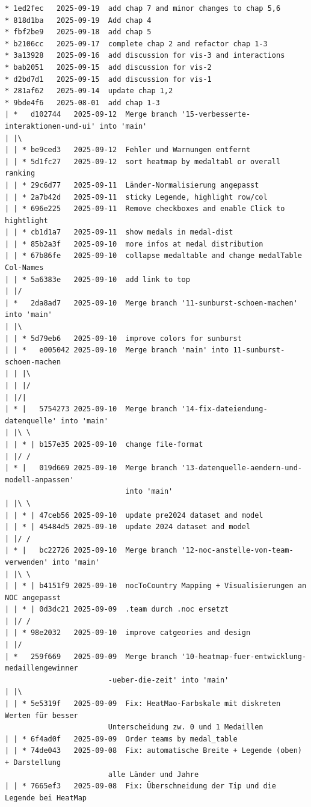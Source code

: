 \documentclass[usegeometry=true]{scrartcl}
\begin{document}
\begin{verbatim}
* 1ed2fec	2025-09-19	add chap 7 and minor changes to chap 5,6
* 818d1ba	2025-09-19	Add chap 4
* fbf2be9	2025-09-18	add chap 5
* b2106cc	2025-09-17	complete chap 2 and refactor chap 1-3
* 3a13928	2025-09-16	add discussion for vis-3 and interactions
* bab2051	2025-09-15	add discussion for vis-2
* d2bd7d1	2025-09-15	add discussion for vis-1
* 281af62	2025-09-14	update chap 1,2
* 9bde4f6	2025-08-01	add chap 1-3
| *   d102744	2025-09-12	Merge branch '15-verbesserte-interaktionen-und-ui' into 'main'
| |\  
| | * be9ced3	2025-09-12	Fehler und Warnungen entfernt
| | * 5d1fc27	2025-09-12	sort heatmap by medaltabl or overall ranking
| | * 29c6d77	2025-09-11	Länder-Normalisierung angepasst
| | * 2a7b42d	2025-09-11	sticky Legende, highlight row/col
| | * 696e225	2025-09-11	Remove checkboxes and enable Click to hightlight
| | * cb1d1a7	2025-09-11	show medals in medal-dist
| | * 85b2a3f	2025-09-10	more infos at medal distribution
| | * 67b86fe	2025-09-10	collapse medaltable and change medalTable Col-Names
| | * 5a6383e	2025-09-10	add link to top
| |/  
| *   2da8ad7	2025-09-10	Merge branch '11-sunburst-schoen-machen' into 'main'
| |\  
| | * 5d79eb6	2025-09-10	improve colors for sunburst
| | *   e005042	2025-09-10	Merge branch 'main' into 11-sunburst-schoen-machen
| | |\  
| | |/  
| |/|   
| * |   5754273	2025-09-10	Merge branch '14-fix-dateiendung-datenquelle' into 'main'
| |\ \  
| | * | b157e35	2025-09-10	change file-format
| |/ /  
| * |   019d669	2025-09-10	Merge branch '13-datenquelle-aendern-und-modell-anpassen'
                            into 'main'
| |\ \  
| | * | 47ceb56	2025-09-10	update pre2024 dataset and model
| | * | 45484d5	2025-09-10	update 2024 dataset and model
| |/ /  
| * |   bc22726	2025-09-10	Merge branch '12-noc-anstelle-von-team-verwenden' into 'main'
| |\ \  
| | * | b4151f9	2025-09-10	nocToCountry Mapping + Visualisierungen an NOC angepasst
| | * | 0d3dc21	2025-09-09	.team durch .noc ersetzt
| |/ /  
| | * 98e2032	2025-09-10	improve catgeories and design
| |/  
| *   259f669	2025-09-09	Merge branch '10-heatmap-fuer-entwicklung-medaillengewinner
                        -ueber-die-zeit' into 'main'
| |\  
| | * 5e5319f	2025-09-09	Fix: HeatMao-Farbskale mit diskreten Werten für besser
                        Unterscheidung zw. 0 und 1 Medaillen
| | * 6f4ad0f	2025-09-09	Order teams by medal_table
| | * 74de043	2025-09-08	Fix: automatische Breite + Legende (oben) + Darstellung
                        alle Länder und Jahre
| | * 7665ef3	2025-09-08	Fix: Überschneidung der Tip und die Legende bei HeatMap

\end{verbatim}
\end{document}
